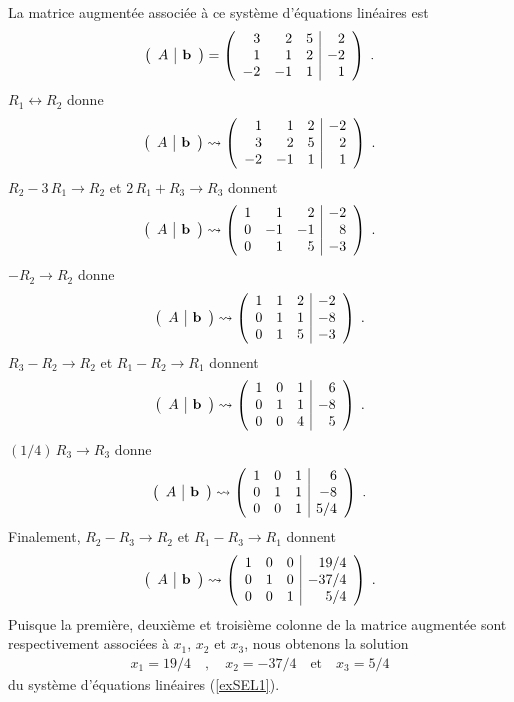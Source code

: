 {\begin{egg}
La matrice augmentée associée à ce système d'équations linéaires est
\[
\left(\begin{array}{c|c}{A}&{\mathbf{b}}\end{array}\right) = \left(\begin{array}{rrr|r}
3 & 2 & 5 & 2 \\
1 & 1 & 2 & -2 \\
-2 & -1 & 1 & 1
\end{array}\right) \; .
\]
$R_1 \leftrightarrow R_2$ donne
\[
\left(\begin{array}{c|c}{A}&{\mathbf{b}}\end{array}\right) \rightsquigarrow \left(\begin{array}{rrr|r}
1 & 1 & 2 & -2 \\
3 & 2 & 5 & 2 \\
-2 & -1 & 1 & 1
\end{array}\right) \; .
\]
$R_2-3\,R_1 \to R_2$ et $2\,R_1+R_3\to R_3$ donnent
\[
\left(\begin{array}{c|c}{A}&{\mathbf{b}}\end{array}\right) \rightsquigarrow \left(\begin{array}{rrr|r}
1 & 1 & 2 & -2 \\
0 & -1 & -1 & 8 \\
0 & 1 & 5 & -3
\end{array}\right) \; .
\]
$-R_2 \to R_2$ donne
\[
\left(\begin{array}{c|c}{A}&{\mathbf{b}}\end{array}\right) \rightsquigarrow \left(\begin{array}{rrr|r}
1 & 1 & 2 & -2 \\
0 & 1 & 1 & -8 \\
0 & 1 & 5 & -3
\end{array}\right) \; .
\]
$R_3-R_2 \to R_2$ et $R_1-R_2 \to R_1$ donnent
\[
\left(\begin{array}{c|c}{A}&{\mathbf{b}}\end{array}\right) \rightsquigarrow \left(\begin{array}{rrr|r}
1 & 0 & 1 & 6 \\
0 & 1 & 1 & -8 \\
0 & 0 & 4 & 5
\end{array}\right) \; .
\]
$(1/4) \, R_3 \to R_3$ donne
\[
\left(\begin{array}{c|c}{A}&{\mathbf{b}}\end{array}\right) \rightsquigarrow \left(\begin{array}{rrr|r}
1 & 0 & 1 & 6 \\
0 & 1 & 1 & -8 \\
0 & 0 & 1 & 5/4
\end{array}\right) \; .
\]
Finalement, $R_2 - R_3 \to R_2$ et $R_1 - R_3 \to R_1$ donnent
\[
\left(\begin{array}{c|c}{A}&{\mathbf{b}}\end{array}\right) \rightsquigarrow \left(\begin{array}{rrr|r}
1 & 0 & 0 & 19/4 \\
0 & 1 & 0 & -37/4 \\
0 & 0 & 1 & 5/4
\end{array}\right) \; .
\]
Puisque la première, deuxième et troisième colonne de la matrice
augmentée sont respectivement associées à $x_1$, $x_2$ et $x_3$, nous
obtenons la solution
\begin{align*}
x_1 = 19/4  \quad , \quad x_2=-37/4 \quad \text{et} \quad x_3=5/4
\end{align*}
du système d'équations linéaires (\ref{exSEL1}).
\end{egg}

}
